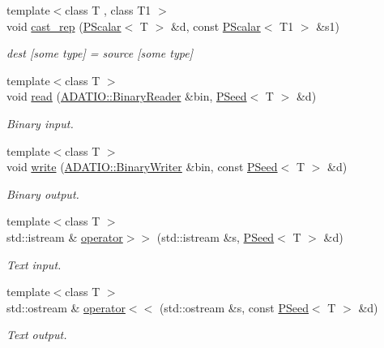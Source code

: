\begin{DoxyCompactItemize}
{\footnotesize template$<$class T , class T1 $>$ }\\void \mbox{\hyperlink{group__primscalar_ga1444be24a3863d0af7a71b450500cb9d}{cast\+\_\+rep}} (\mbox{\hyperlink{classENSEM_1_1PScalar}{P\+Scalar}}$<$ T $>$ \&d, const \mbox{\hyperlink{classENSEM_1_1PScalar}{P\+Scalar}}$<$ T1 $>$ \&s1)
\begin{DoxyCompactList}\small\item\em dest \mbox{[}some type\mbox{]} = source \mbox{[}some type\mbox{]} \end{DoxyCompactList}\item 
{\footnotesize template$<$class T $>$ }\\void \mbox{\hyperlink{group__primseed_ga89a527bfdc043ff49f07e44a2fbb7a90}{read}} (\mbox{\hyperlink{classADATIO_1_1BinaryReader}{A\+D\+A\+T\+I\+O\+::\+Binary\+Reader}} \&bin, \mbox{\hyperlink{classENSEM_1_1PSeed}{P\+Seed}}$<$ T $>$ \&d)
\begin{DoxyCompactList}\small\item\em Binary input. \end{DoxyCompactList}\item 
{\footnotesize template$<$class T $>$ }\\void \mbox{\hyperlink{group__primseed_gab778cd144e6a01cdbab68adedc21d456}{write}} (\mbox{\hyperlink{classADATIO_1_1BinaryWriter}{A\+D\+A\+T\+I\+O\+::\+Binary\+Writer}} \&bin, const \mbox{\hyperlink{classENSEM_1_1PSeed}{P\+Seed}}$<$ T $>$ \&d)
\begin{DoxyCompactList}\small\item\em Binary output. \end{DoxyCompactList}\item 
{\footnotesize template$<$class T $>$ }\\std\+::istream \& \mbox{\hyperlink{group__primseed_gaab9d3da69048030afda4583bcd687578}{operator$>$$>$}} (std\+::istream \&s, \mbox{\hyperlink{classENSEM_1_1PSeed}{P\+Seed}}$<$ T $>$ \&d)
\begin{DoxyCompactList}\small\item\em Text input. \end{DoxyCompactList}\item 
{\footnotesize template$<$class T $>$ }\\std\+::ostream \& \mbox{\hyperlink{group__primseed_ga63a0cabc9de5d7af797139dcbe08c7eb}{operator$<$$<$}} (std\+::ostream \&s, const \mbox{\hyperlink{classENSEM_1_1PSeed}{P\+Seed}}$<$ T $>$ \&d)
\begin{DoxyCompactList}\small\item\em Text output. \end{DoxyCompactList}\item 

\end{DoxyCompactItemize}
